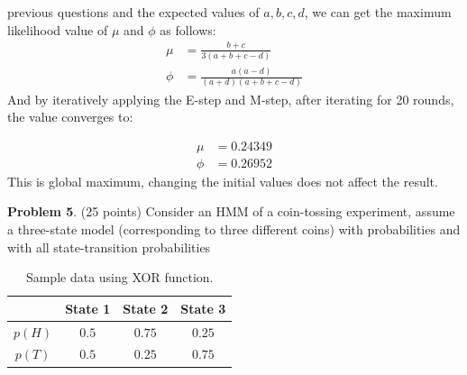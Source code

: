 \documentclass{article}
\begin{document}
\begin{enumerate}
{  previous questions and the expected values of $a,b,c,d$, we can get
  the maximum likelihood value of $\mu$ and $\phi$ as follows: 
  \begin{align*}
    \mu & = \frac{b+c}{3(a+b+c-d)} \\
    \phi & = \frac{a(a-d)}{(a+d)(a+b+c-d)}
  \end{align*}
  And by iteratively applying the E-step and M-step, after iterating for 20
  rounds, the value converges to: 
  \ttfamily\selectfont{
    h = 20; \\ 
    g = 19; \\
    u = 10; \\
    p = 10; \\
    i = 1:50; \\
    for x = i,\\
    a = (p * h / u ) / (1 + p / u); \\
    b = h / (1 + p / u);\\
    c = 2 * u * g / (1 - p - u); \\
    d = (1 - p - 3 * u); \\
    
    u = (b + c) / (3 * (a + b + c -d));\\
    p = a * (a - d) / ((a + d) * (a + b + c - d));\\
    
    u, p\\
    endfor;}\normalfont

  \begin{align*}
    \mu & = 0.24349 \\
    \phi & = 0.26952
  \end{align*}
  This is global maximum, changing the initial values does not affect the
  result. 
}
\end{enumerate}

\textbf{Problem 5}. (25 points) Consider an HMM of a coin-tossing
experiment, assume a three-state model (corresponding to three
different coins) with probabilities and with all state-transition
probabilities 
\begin{table}[h]
  \centering
  \begin{tabular}{cccc}
    \toprule
    & \textbf{State 1} & \textbf{State 2} & \textbf{State 3} \\ \toprule
    $p(H)$ & $0.5$ & $0.75$ & $0.25$ \\ \midrule
    $p(T)$ & $0.5$ & $0.25$ & $0.75$ \\ \bottomrule
  \end{tabular}
  \caption{Sample data using XOR function.}
  \label{tbl:1-f}
\end{table}
\end{document}
